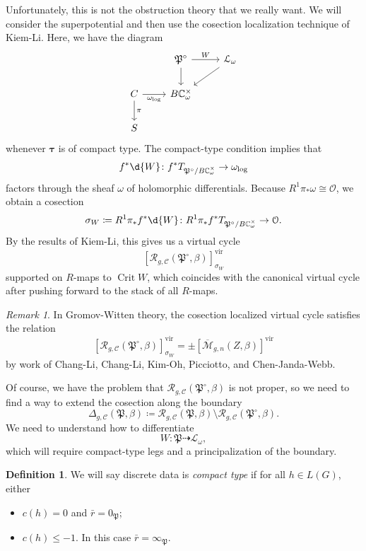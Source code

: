 \documentclass[10pt]{amsart}
\theoremstyle{definition}
\newtheorem{defn}[thm]{Definition}
\theoremstyle{remark}
\newtheorem{rmk}[thm]{Remark}
\theoremstyle{plain}
\theoremstyle{definition}
\theoremstyle{remark}
\newcommand{\C}{\mathbb{C}}
\newcommand{\Mbar}{\overline{\mathcal{M}}}
\newcommand{\mc}[1]{\mathcal{#1}}
\newcommand{\mf}[1]{\mathfrak{#1}}
\newcommand{\btau}{\bm{\tau}}
\newcommand{\mr}[1]{\mathrm{#1}}
\newcommand{\1}{\mathbf{1}}
\newcommand{\2}{\mathbf{2}}
\newcommand{\3}{\mathbf{3}}
\newcommand{\vir}{\mr{vir}}
\DeclareMathOperator{\Crit}{Crit}
\begin{document}
Unfortunately, this is not the obstruction theory that we really want. We will consider the superpotential and then use the cosection localization technique of Kiem-Li. Here, we have the diagram
\begin{equation*}
\begin{tikzcd}
    & \mf{P}^{\circ} \ar{r}{W} \ar{d} & \mc{L}_{\omega} \ar{dl} \\
    C \ar[swap]{r}{\omega_{\log}} \ar{d}{\pi} & B \C_{\omega}^{\times} \\
    S
\end{tikzcd}
\end{equation*}
whenever $\btau$ is of compact type. The compact-type condition implies that
\[ f^* \d{W} \colon f^* T_{\mf{P}^{\circ}/B\C_{\omega}^{\times}} \to \omega_{\log} \]
factors through the sheaf $\omega$ of holomorphic differentials. Because $R^1 \pi_* \omega \cong \mc{O}$, we obtain a cosection
\[ \sigma_W \coloneqq R^1 \pi_* f^* \d{W} \colon R^1 \pi_* f^* T_{\mf{P}^{\circ}/B \C_{\omega}^{\times}} \to \mc{O}. \]
By the results of Kiem-Li, this gives us a virtual cycle
\[ [\mc{R}_{g, \mc{C}}(\mf{P}^{\circ}, \beta)]^{\vir}_{\sigma_W} \]
supported on $R$-maps to $\Crit W$,
which coincides with the canonical virtual cycle after pushing forward to the stack of all $R$-maps.

\begin{rmk}
    In Gromov-Witten theory, the cosection localized virtual cycle satisfies the relation
    \[ [ \mc{R}_{g, \mc{C}}(\mf{P}^{\circ},\beta) ]^{\vir}_{\sigma_W} = \pm [\Mbar_{g,n}(Z,\beta)]^{\vir} \]
    by work of Chang-Li, Chang-Li, Kim-Oh, Picciotto, and Chen-Janda-Webb.
\end{rmk}

Of course, we have the problem that $\mc{R}_{g, \mc{C}}(\mf{P}^{\circ}, \beta)$ is not proper, so we need to find a way to extend the cosection along the boundary
\[ \Delta_{g, \mc{C}} (\mf{P}, \beta) \coloneqq \mc{R}_{g, \mc{C}}(\mf{P}, \beta) \setminus \mc{R}_{g,\mc{C}}(\mf{P}^{\circ}, \beta). \]
We need to understand how to differentiate
\[ W \colon \mf{P} \dashrightarrow \mc{L}_{\omega}, \]
which will require compact-type legs and a principalization of the boundary.

\begin{defn}
    We will say discrete data is \textit{compact type} if for all $h \in L(G)$, either
    \begin{itemize}
        \item $c(h) = 0$ and $\bar{r} = 0_{\mf{P}}$;
        \item $c(h) \leq -1$. In this case $\bar{r} = \infty_{\mf{P}}$.
    \end{itemize}
\end{defn}
\end{document}
